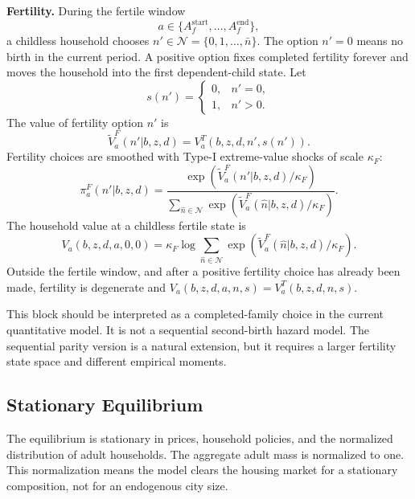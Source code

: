 \documentclass[11pt]{article}
\newcommand{\Nset}{\mathcal N}
\begin{document}
\textbf{Fertility.}
During the fertile window
\begin{equation*}
    a\in\{A_f^{\mathrm{start}},\ldots,A_f^{\mathrm{end}}\},
\end{equation*}
a childless household chooses $n'\in\Nset=\{0,1,\ldots,\bar n\}$. The option
$n'=0$ means no birth in the current period. A positive option fixes completed
fertility forever and moves the household into the first dependent-child state.
Let
\begin{equation*}
    s(n')=
    \begin{cases}
    0, & n'=0,\\
    1, & n'>0.
    \end{cases}
\end{equation*}
The value of fertility option $n'$ is
\begin{equation}
\widetilde V^F_a(n'|b,z,d)
=
V^T_a(b,z,d,n',s(n')).
\label{eq:fert_branch_value}
\end{equation}
Fertility choices are smoothed with Type-I extreme-value shocks of scale
$\kappa_F$:
\begin{equation}
\pi^F_a(n'|b,z,d)
=
\frac{
\exp\left(\widetilde V^F_a(n'|b,z,d)/\kappa_F\right)
}{
\sum_{\hat n\in\Nset}
\exp\left(\widetilde V^F_a(\hat n|b,z,d)/\kappa_F\right)
}.
\label{eq:fert_probs}
\end{equation}
The household value at a childless fertile state is
\begin{equation}
V_a(b,z,d,a,0,0)
=
\kappa_F
\log
\sum_{\hat n\in\Nset}
\exp\left(\widetilde V^F_a(\hat n|b,z,d)/\kappa_F\right).
\label{eq:fert_iv}
\end{equation}
Outside the fertile window, and after a positive fertility choice has already
been made, fertility is degenerate and $V_a(b,z,d,a,n,s)=V^T_a(b,z,d,n,s)$.

This block should be interpreted as a completed-family choice in the current
quantitative model. It is not a sequential second-birth hazard model. The
sequential parity version is a natural extension, but it requires a larger
fertility state space and different empirical moments.

\subsection{Stationary Equilibrium}

The equilibrium is stationary in prices, household policies, and the normalized
distribution of adult households. The aggregate adult mass is normalized to one.
This normalization means the model clears the housing market for a stationary
composition, not for an endogenous city size.
\end{document}
